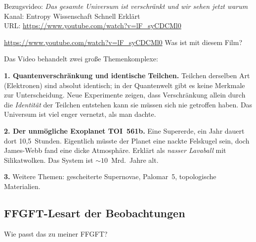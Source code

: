 \documentclass[11pt,a4paper]{article}
\begin{document}
\begin{videobox}
Bezugsvideo: \emph{Das gesamte Universum ist verschr\"ankt \textendash{} und wir sehen jetzt warum} \\
Kanal: Entropy \textendash{} Wissenschaft Schnell Erkl\"art \\
URL: \url{https://www.youtube.com/watch?v=lF_syCDCMl0}
\end{videobox}

\begin{userbox}
\url{https://www.youtube.com/watch?v=lF_syCDCMl0} \quad Was ist mit diesem Film?
\end{userbox}

\begin{geminibox}
Das Video behandelt zwei gro{\ss}e Themenkomplexe:

\textbf{1. Quantenverschr\"ankung und identische Teilchen.} Teilchen derselben Art (Elektronen) sind absolut identisch; in der Quantenwelt gibt es keine Merkmale zur Unterscheidung. Neue Experimente zeigen, dass Verschr\"ankung allein durch die \emph{Identit\"at} der Teilchen entstehen kann \textendash{} sie m\"ussen sich nie getroffen haben. Das Universum ist viel enger vernetzt, als man dachte.

\textbf{2. Der \glqq unm\"ogliche\grqq{} Exoplanet TOI~561b.} Eine Supererde, ein Jahr dauert dort 10{,}5~Stunden. Eigentlich m\"usste der Planet eine nackte Felskugel sein, doch James-Webb fand eine dicke Atmosph\"are. Erkl\"art als \emph{nasser Lavaball} mit Silikatwolken. Das System ist $\sim 10$~Mrd.~Jahre alt.

\textbf{3.} Weitere Themen: gescheiterte Supernovae, Palomar~5, topologische Materialien.
\end{geminibox}

\subsection{FFGFT-Lesart der Beobachtungen}

\begin{userbox}
Wie passt das zu meiner FFGFT?
\end{userbox}
\end{document}
